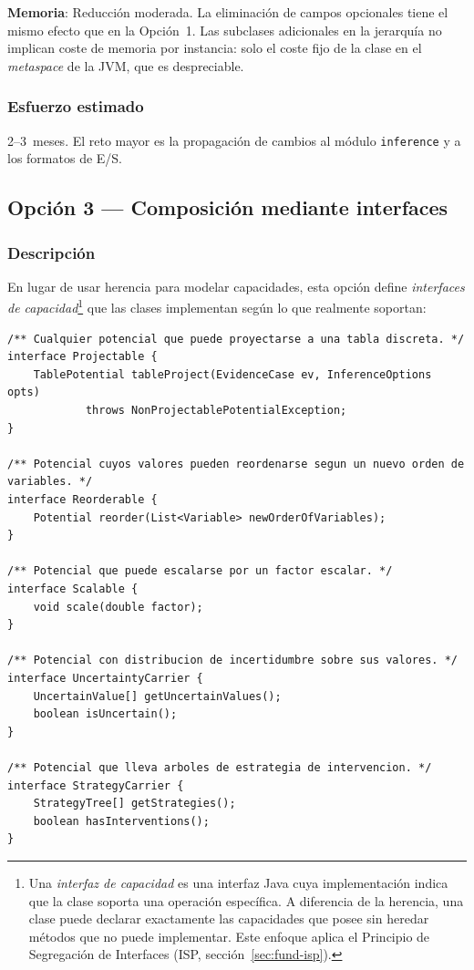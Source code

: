 \documentclass[11pt,a4paper]{article}
\newcommand{\code}[1]{\texttt{#1}}
\begin{document}
\textbf{Memoria}: Reducción moderada.  La eliminación de campos opcionales tiene
el mismo efecto que en la Opción~1.  Las subclases adicionales en la jerarquía
no implican coste de memoria por instancia: solo el coste fijo de la clase en el
\emph{metaspace} de la JVM, que es despreciable.

\subsubsection*{Esfuerzo estimado}

2--3~meses.  El reto mayor es la propagación de cambios al módulo
\code{inference} y a los formatos de E/S.

\subsection{Opción 3 --- Composición mediante interfaces}
\label{sec:op3}

\subsubsection*{Descripción}

En lugar de usar herencia para modelar capacidades, esta opción define
\emph{interfaces de capacidad}\footnote{Una \emph{interfaz de capacidad} es una
interfaz Java cuya implementación indica que la clase soporta una operación
específica.  A diferencia de la herencia, una clase puede declarar exactamente
las capacidades que posee sin heredar métodos que no puede implementar.
Este enfoque aplica el Principio de Segregación de Interfaces (ISP,
sección~\ref{sec:fund-isp}).} que las clases implementan según lo que realmente
soportan:

\begin{lstlisting}[caption={Interfaces de capacidad}]
/** Cualquier potencial que puede proyectarse a una tabla discreta. */
interface Projectable {
    TablePotential tableProject(EvidenceCase ev, InferenceOptions opts)
            throws NonProjectablePotentialException;
}

/** Potencial cuyos valores pueden reordenarse segun un nuevo orden de variables. */
interface Reorderable {
    Potential reorder(List<Variable> newOrderOfVariables);
}

/** Potencial que puede escalarse por un factor escalar. */
interface Scalable {
    void scale(double factor);
}

/** Potencial con distribucion de incertidumbre sobre sus valores. */
interface UncertaintyCarrier {
    UncertainValue[] getUncertainValues();
    boolean isUncertain();
}

/** Potencial que lleva arboles de estrategia de intervencion. */
interface StrategyCarrier {
    StrategyTree[] getStrategies();
    boolean hasInterventions();
}
\end{lstlisting}
\end{document}
